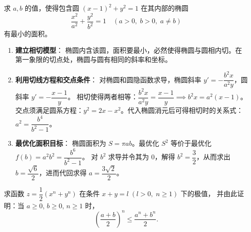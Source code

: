 \documentclass[lang=cn,11pt]{elegantbook}
\begin{document}

\begin{exercise}[椭圆面积的最小化]
求 $a,b$ 的值，使得包含圆 $(x-1)^2+y^2=1$ 在其内部的椭圆
\[\frac{x^2}{a^2}+\frac{y^2}{b^2}=1\quad(a>0,\;b>0,\;a \neq b)
\]
有最小的面积。
\end{exercise}

\begin{solution}
\begin{enumerate}
  \item \textbf{建立相切模型}：
  椭圆内含该圆，面积要最小，必然使得椭圆与圆相内切。在第一象限的切点处，椭圆与圆有相同的斜率和坐标。
  \item \textbf{利用切线方程和交点条件}：
  对椭圆和圆隐函数求导，椭圆斜率 $y' = -\dfrac{b^2 x}{a^2 y}$，圆斜率 $y' = -\dfrac{x-1}{y}$。
  相切使得两者相等：$\dfrac{b^2 x}{a^2 y} = \dfrac{x-1}{y} \implies b^2 x = a^2(x-1)$。
  交点须满足圆系方程：$y^2 = 2x-x^2$。代入椭圆消元后可得相切时的关系式：$a^2 = \dfrac{b^4}{b^2-1}$。
  \item \textbf{最优化面积目标}：
  椭圆面积为 $S = \pi ab$。最优化 $S^2$ 等价于最优化 $f(b) = a^2b^2 = \dfrac{b^6}{b^2-1}$。
  对 $b^2$ 求导并令其为 $0$，解得 $b^2 = \dfrac{3}{2}$，从而求出 $b = \dfrac{\sqrt{6}}{2}$，进而代回求得 $a = \dfrac{3\sqrt{2}}{2}$。
\end{enumerate}
\end{solution}



\begin{exercise}
求函数 $z=\dfrac{1}{2}(x^n+y^n)$ 在条件 $x+y=l\;(l>0,\;n\geq 1)$ 下的极值，
并由此证明：当 $a\geq 0$, $b\geq 0$, $n\geq 1$ 时，
\[
\left(\frac{a+b}{2}\right)^{\!n}\!\leq\!\frac{a^n+b^n}{2}.
\]
\end{exercise}
\end{document}
